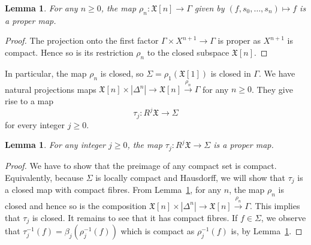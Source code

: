 \documentclass[a4paper]{amsart}
\newcommand{\fX}{\mathfrak X}
\newcommand{\lra}{\longrightarrow}
\theoremstyle{plain}
\newtheorem{lemma}[theorem]{Lemma}
\theoremstyle{definition}
\begin{document}
\begin{lemma}\label{lemma:rhonisproper}
For any $n \geq 0$, the map $\rho_n \colon \fX[n] \to \Gamma$ given by $(f,s_0,\ldots,s_n) \mapsto f$ is a proper map.
\end{lemma}
\begin{proof}
The projection onto the first factor $\Gamma \times X^{n+1} \to \Gamma$ is proper as $X^{n+1}$ is compact. Hence so is its restriction $\rho_n$ to the closed subspace $\fX[n]$.
\end{proof}

In particular, the map $\rho_n$ is closed, so $\Sigma = \rho_1(\fX[1])$ is closed in $\Gamma$. We have natural projections maps $\fX[n] \times |\Delta^n| \to \fX[n] \overset{\rho_n}{\to} \Gamma$ for any $n \geq 0$. They give rise to a map
\begin{equation}\label{eqn:defoftauj}
    \tau_j \colon R^j\fX \lra \Sigma
\end{equation}
for every integer $j \geq 0$. 
\begin{lemma}\label{lemma:taujprojectionisproper}
For any integer $j \geq 0$, the map $\tau_j \colon R^j\fX \to \Sigma$ is a proper map.
\end{lemma}
\begin{proof}
We have to show that the preimage of any compact set is compact. Equivalently, because $\Sigma$ is locally compact and Hausdorff, we will show that $\tau_j$ is a closed map with compact fibres.
From Lemma~\ref{lemma:rhonisproper}, for any $n$, the map $\rho_n$ is closed and hence so is the composition $\fX[n] \times |\Delta^n| \to \fX[n] \overset{\rho_n}{\to} \Gamma$. This implies that $\tau_j$ is closed. It remains to see that it has compact fibres. If $f \in \Sigma$, we observe that $\tau_j^{-1}(f) = \beta_j \left( \rho_j^{-1}(f) \right)$ which is compact as $\rho_j^{-1}(f)$ is, by Lemma~\ref{lemma:rhonisproper}.
\end{proof}
\end{document}
